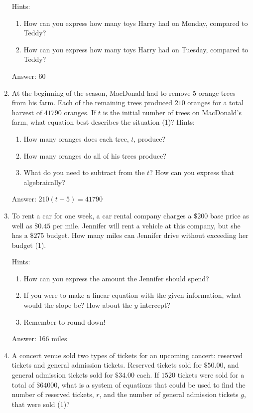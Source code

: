 \documentclass{article}
\begin{document}
\begin{enumerate}
{	      Hints:
	      \begin{enumerate}
		      \item {How can you express how many toys Harry had on Monday, compared to Teddy?}
		      \item {How can you express how many toys Harry had on Tuesday, compared to Teddy?}
	      \end{enumerate}

	      Answer: 60
	      }


	\item {
	      At the beginning of the season, MacDonald had to remove $5$ orange trees from his farm. Each of the remaining trees produced $210$ oranges for a total harvest of $41790$ oranges. If $t$ is the initial number of trees on MacDonald's farm, what equation best describes the situation (1)?
	      Hints:
	      \begin{enumerate}
		      \item {How many oranges does each tree, $t$, produce?}
		      \item {How many oranges do all of his trees produce?}
		      \item{What do you need to subtract from the $t$? How can you express that algebraically?}
	      \end{enumerate}

	      Answer: $210(t-5)=41790$
	      }

	\item {
	      To rent a car for one week, a car rental company charges a $\$200$ base price as well as $\$0.45$ per mile. Jennifer will rent a vehicle at this company, but she has a $\$275$ budget. How many miles can Jennifer drive without exceeding her budget (1).

	      Hints:
	      \begin{enumerate}
		      \item{How can you express the amount the Jennifer should spend?}
		      \item{If you were to make a linear equation with the given information, what would the slope be? How about the $y$ intercept?}
		      \item{Remember to round down!}
	      \end{enumerate}

	      Answer: 166 miles
	      }

	\item {
	      A concert venue sold two types of tickets for an upcoming concert: reserved tickets and general admission tickets. Reserved tickets sold for $\$50.00$, and general admission tickets sold for $\$34.00$ each. If $1520$ tickets were sold for a total of $\$64000$, what is a system of equations that could be used to find the number of reserved tickets, $r$, and the number of general admission tickets $g$, that were sold (1)?

}
\end{enumerate}
\end{document}
